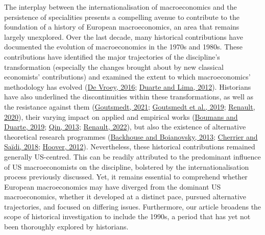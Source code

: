 \documentclass[
  12pt,
  onecolumn]{article}
\begin{document}
The interplay between the internationalisation of macroeconomics and the persistence of specialities presents a compelling avenue to contribute to the foundation of a history of European macroeconomics, an area that remains largely unexplored. Over the last decade, many historical contributions have documented the evolution of macroeconomics in the 1970s and 1980s. These contributions have identified the major trajectories of the discipline's transformation (especially the changes brought about by new classical economists' contributions) and examined the extent to which macroeconomics' methodology has evolved (\protect\hyperlink{ref-devroey2016}{De Vroey, 2016}; \protect\hyperlink{ref-duartelima2012a}{Duarte and Lima, 2012}). Historians have also underlined the discontinuities within these transformations, as well as the resistance against them (\protect\hyperlink{ref-goutsmedt2021b}{Goutsmedt, 2021}; \protect\hyperlink{ref-goutsmedtetal2019}{Goutsmedt et al., 2019}; \protect\hyperlink{ref-renault2020a}{Renault, 2020}), their varying impact on applied and empirical works (\protect\hyperlink{ref-boumans2019}{Boumans and Duarte, 2019}; \protect\hyperlink{ref-qin2013a}{Qin, 2013}; \protect\hyperlink{ref-renault2022}{Renault, 2022}), but also the existence of alternative theoretical research programmes (\protect\hyperlink{ref-backhouseboianovski2013}{Backhouse and Boianovsky, 2013}; \protect\hyperlink{ref-cherrier2018c}{Cherrier and Saïdi, 2018}; \protect\hyperlink{ref-hoover2012}{Hoover, 2012}). Nevertheless, these historical contributions remained generally US-centred. This can be readily attributed to the predominant influence of US macroeconomists on the discipline, bolstered by the internationalisation process previously discussed. Yet, it remains essential to comprehend whether European macroeconomics may have diverged from the dominant US macroeconomics, whether it developed at a distinct pace, pursued alternative trajectories, and focused on differing issues. Furthermore, our article broadens the scope of historical investigation to include the 1990s, a period that has yet not been thoroughly explored by historians.
\end{document}
